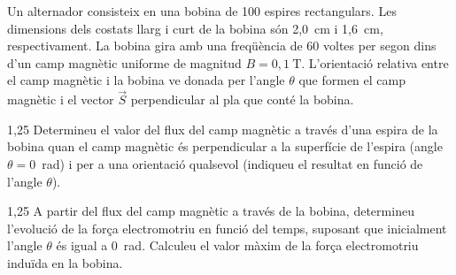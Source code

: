 Un alternador consisteix en una bobina de 100 espires rectangulars. Les dimensions dels costats llarg i curt de la bobina són 2,0~cm i 1,6~cm, respectivament. La bobina gira amb una freqüència de 60 voltes per segon dins d'un camp magnètic uniforme de magnitud $B = 0,1\ \mathrm{T}$. L'orientació relativa entre el camp magnètic i la bobina ve donada per l'angle $\theta$ que formen el camp magnètic i el vector $\vec{S}$ perpendicular al pla que conté la bobina.


\begin{apartat}{1,25}
Determineu el valor del flux del camp magnètic a través d'una espira de la bobina quan el camp magnètic és perpendicular a la superfície de l'espira (angle $\theta = 0$~rad) i per a una orientació qualsevol (indiqueu el resultat en funció de l'angle $\theta$).
\end{apartat}

\begin{apartat}{1,25}
A partir del flux del camp magnètic a través de la bobina, determineu l'evolució de la força electromotriu en funció del temps, suposant que inicialment l'angle $\theta$ és igual a 0~rad. Calculeu el valor màxim de la força electromotriu induïda en la bobina.
\end{apartat}
